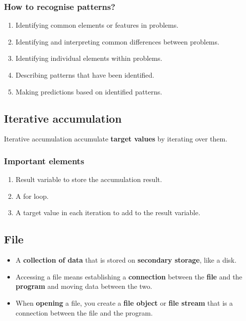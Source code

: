 \documentclass[11pt]{article}
\begin{document}
\subsubsection{How to recognise patterns?}
\label{sec:org508b660}
\begin{enumerate}
\item Identifying common elements or features in problems.
\item Identifying and interpreting common differences between problems.
\item Identifying individual elements within problems.
\item Describing patterns that have been identified.
\item Making predictions based on identified patterns.
\end{enumerate}

 \newpage

\subsection{Iterative accumulation}
\label{sec:org5297aa5}
Iterative accumulation accumulate \textbf{target values} by iterating over them.

\subsubsection{Important elements}
\label{sec:orge708049}
\begin{enumerate}
\item Result variable to store the accumulation result.
\item A for loop.
\item A target value in each iteration to add to the result variable.
\end{enumerate}

\subsection{File}
\label{sec:orgb51805a}
\begin{itemize}
\item A \textbf{collection of data} that is stored on \textbf{secondary storage}, like a disk.
\item Accessing a file means establishing a \textbf{connection} between the \textbf{file} and the \textbf{program} and moving data between the two.
\item When \textbf{opening} a file, you create a \textbf{file object} or \textbf{file stream} that is a connection between the file and the program.
\end{itemize}
\end{document}
